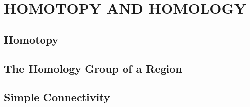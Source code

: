 \documentclass{refbook}
\begin{document}
\section{HOMOTOPY AND HOMOLOGY}
\subsection{Homotopy}
\subsection{The Homology Group of a Region}
\subsection{Simple Connectivity}

\section{}
\end{document}

